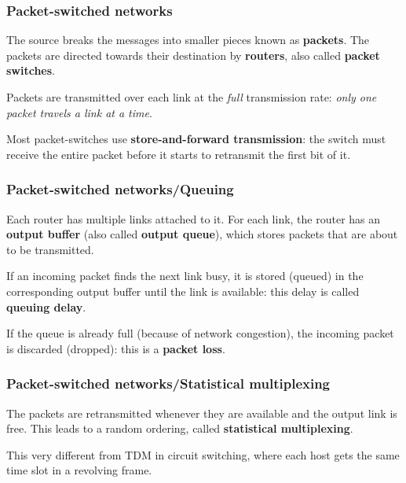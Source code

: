 %
\begin{frame}
\frametitle{Packet-switched networks}

The source breaks the messages into smaller pieces known as
\textbf{packets}. The packets are directed towards their destination
by \textbf{routers}, also called \textbf{packet switches}.

\bigskip

Packets are transmitted over each link at the \emph{full} transmission
rate: \emph{only one packet travels a link at a time}.

\bigskip

Most packet-switches use \textbf{store-and-forward transmission}: the
switch must receive the entire packet before it starts to retransmit
the first bit of it.

\end{frame}

%
\begin{frame}
\frametitle{Packet-switched networks/Queuing}

Each router has multiple links attached to it. For each link, the
router has an \textbf{output buffer} (also called \textbf{output
queue}), which stores packets that are about to be transmitted.

\bigskip

If an incoming packet finds the next link busy, it is stored (queued)
in the corresponding output buffer until the link is available: this
delay is called \textbf{queuing delay}.

\bigskip

If the queue is already full (because of network congestion), the
incoming packet is discarded (dropped): this is a \textbf{packet
loss}.

\end{frame}

%
\begin{frame}
\frametitle{Packet-switched networks/Statistical multiplexing}

The packets are retransmitted whenever they are available and the
output link is free. This leads to a random ordering, called
\textbf{statistical multiplexing}.

\bigskip

This very different from TDM in circuit switching, where each host
gets the same time slot in a revolving frame.

\end{frame}

